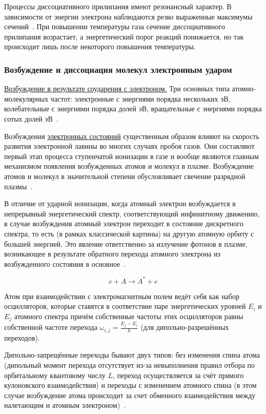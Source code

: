 \documentclass[10pt, a4paper]{article}
\begin{document}
Процессы диссоциативного прилипания имеют резонансный характер. В зависимости от энергии электрона наблюдаются резко выраженные максимумы сечений~\cite{raizer}. При повышении температуры газа сечение диссоциативного прилипания возрастает, а энергетический порог реакций понижается, но так происходит лишь после некоторого повышения температуры.

\subsubsection{Возбуждение и диссоциация молекул электронным ударом}

\uline{Возбуждение в результате соударения с электроном.} Три основных типа атомно-молекулярных частот: электронные с энергиями порядка нескольких эВ, колебательные с энергиями порядка долей эВ, вращательные с энергиями порядка сотых долей эВ~\cite{astap}.

Возбуждения \uline{электронных состояний} существенным образом влияют на скорость развития электронной лавины во многих случаях пробоя газов. Они составляют первый этап процесса ступенчатой ионизации в газе и вообще являются главным механизмом появления возбужденных атомов и молекул в плазме. Возбуждение атомов и молекул в значительной степени обусловливает свечение разрядной плазмы~\cite{raizer}.

В отличие от ударной ионизации, когда атомный электрон возбуждается в непрерывный энергетический спектр, соответствующий инфинитному движению, в случае возбуждения атомный электрон переходит в состояние дискретного спектра, то есть (в рамках классической картины) на другую атомную орбиту с большей энергией. Это явление ответственно за излучение фотонов в плазме, возникающее в результате обратного перехода атомного электрона из возбужденного состояния в основное~\cite{astap}.

\begin{equation*}
	e + A \rightarrow A^{*} + e
\end{equation*}

Атом при взаимодействии с электромагнитным полем ведёт себя как набор осцилляторов, которые ставятся в соответствие паре энергетических уровней $E_i$ и $E_j$ атомного спектра причём собственные частоты этих осцилляторов равны собственной частоте перехода $\omega_{i,j}=\frac{E_j-E_i}{\hbar}$ (для дипольно-разрешённых переходов).

Дипольно-запрещённые переходы бывают двух типов: без изменения спина атома (дипольный момент перехода отсутствует из-за невыполнения правил отбора по орбитальному квантовому числу $L$, переход осуществляется за счёт прямого кулоновского взаимодействия) и переходы с изменением атомного спина (в этом случае возбуждение атома происходит за счет обменного взаимодействия между налетающим и атомным электроном)~\cite{astap}.
\end{document}
